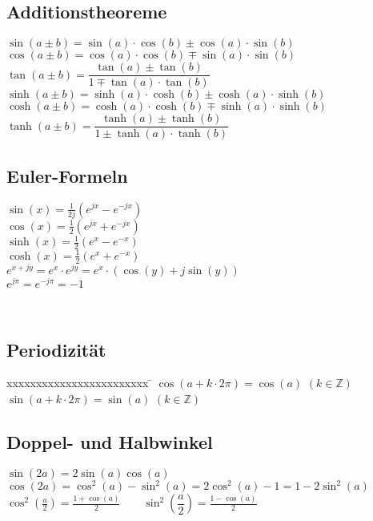 \begin{minipage}[t]{0.5\textwidth}
\subsection{Additionstheoreme}
	$\sin(a \pm b)=\sin(a) \cdot \cos(b) \pm \cos(a) \cdot \sin(b)$\\
	$\cos(a \pm b)=\cos(a) \cdot \cos(b) \mp \sin(a) \cdot \sin(b)$\\	
	$\tan(a \pm b)=\dfrac{\tan(a) \pm \tan(b)}{1 \mp \tan(a) \cdot \tan(b)}$\\
	$\sinh(a \pm b)=\sinh(a) \cdot \cosh(b) \pm \cosh(a) \cdot \sinh(b)$\\
	$\cosh(a \pm b)=\cosh(a) \cdot \cosh(b) \mp \sinh(a) \cdot \sinh(b)$\\	
	$\tanh(a \pm b)=\dfrac{\tanh(a) \pm \tanh(b)}{1 \pm \tanh(a) \cdot \tanh(b)}$\\
\end{minipage}
%
\begin{minipage}[t]{0.5\textwidth}
	\subsection{Euler-Formeln} 
	$\sin(x) = \frac{1}{2j} \left(e^{jx} - e^{-jx}\right)$ \\
	$\cos(x) = \frac{1}{2} \left(e^{jx} + e^{-jx}\right)$ \\
	$\sinh(x) = \frac{1}{2} \left(e^{x} - e^{-x}\right)$ \\
	$\cosh(x) = \frac{1}{2} \left(e^{x} + e^{-x}\right)$ \\
	$e^{x+jy} = e^x \cdot e^{jy} = e^x \cdot \left(\cos(y) + j\sin(y)\right)$ \\
	$e^{j\pi} = e^{-j\pi} = -1$ \\
\end{minipage}
\\[10pt]
%
\begin{minipage}[t]{0.5\textwidth}
\subsection{Periodizität}
	\begin{tabbing}
		xxxxxxxxxxxxxxxxxxxxxxxx \= \kill
		$\cos(a+k\cdot2\pi)=\cos(a)$ \> $(k \in \mathbb{Z})$\\
		$\sin(a+k\cdot2\pi)=\sin(a)$ \> $(k \in \mathbb{Z})$
	\end{tabbing}	
\end{minipage}
%
\begin{minipage}[t]{0.5\textwidth}
	\subsection{Doppel- und Halbwinkel}	
	$\sin(2a)=2\sin(a)\cos(a)$\\
	$\cos(2a)=\cos^2(a)-\sin^2(a)=2\cos^2(a)-1=1-2\sin^2(a)$\\
	$\cos^2 \left(\frac{a}{2}\right)=\frac{1+\cos(a)}{2} \qquad
	\sin^2 \left(\dfrac{a}{2}\right)=\frac{1-\cos(a)}{2}$
\end{minipage}
